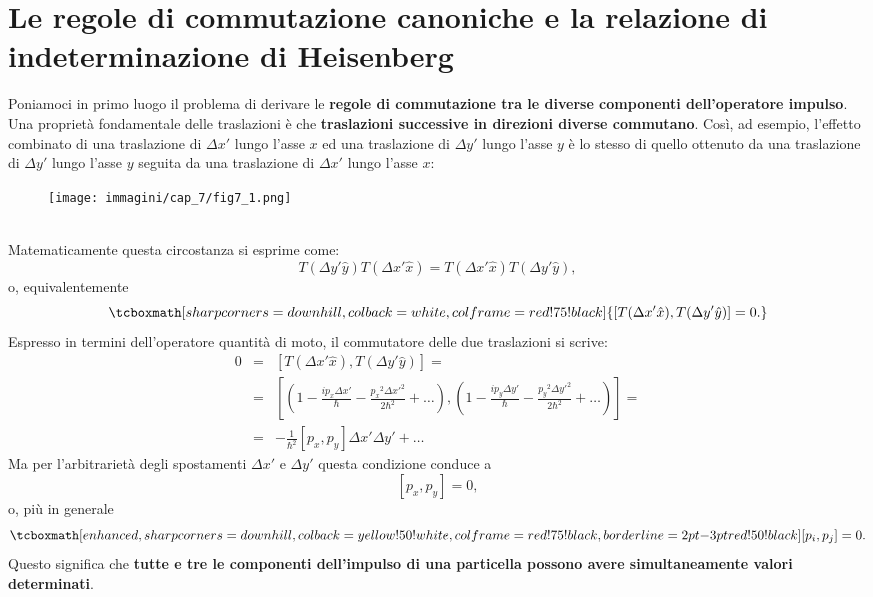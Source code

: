\documentclass[a4paper,12pt,oneside]{book}
\begin{document}
\section[Le regole di commutazione canoniche e la relazione di indeterminazione di Heisenberg]{Le regole di commutazione canoniche e la relazione di indeterminazione di Heisenberg}
Poniamoci in primo luogo il problema di derivare le \textbf{regole di commutazione tra le diverse componenti dell'operatore impulso}.\\
Una proprietà fondamentale delle traslazioni è che \textbf{traslazioni successive in direzioni diverse commutano}. Così, ad esempio, l'effetto combinato di una traslazione di $\Delta x'$ lungo l'asse $x$ ed una traslazione di $\Delta y'$ lungo l'asse $y$ è lo stesso di quello ottenuto da una traslazione di $\Delta y'$ lungo l'asse $y$ seguita da una traslazione di $\Delta x'$ lungo l'asse $x$:\\
\begin{figure}[!htbp]
\begin{center}
\texttt{[image: immagini/cap\_7/fig7\_1.png]}
\end{center}
\end{figure}\\
Matematicamente questa circostanza si esprime come:
	\begin{equation}
		T(\Delta y'\hat{y})T(\Delta x'\hat{x})= T(\Delta x'\hat{x})T(\Delta y'\hat{y}),
	\end{equation}
o, equivalentemente
	\begin{equation}
		\tcboxmath[sharp corners=downhill ,colback=white,colframe=red!75!black]{
			\left[ T(\Delta x'\hat{x}), T(\Delta y'\hat{y})\right] =0.
			}
	\end{equation}
Espresso in termini dell'operatore quantità di moto, il commutatore delle due traslazioni si scrive:
	\begin{eqnarray}
		0 & = & \left[ T(\Delta x'\hat{x}), T(\Delta y'\hat{y})\right] =   \nonumber \\
		 & = & \left[\left( 1-\frac{i p_x \Delta x'}{\hbar}-\frac{ {p_x} ^2 {\Delta x'}^2}{2\hbar ^2}+\dots \right), \left( 1-\frac{i p_y \Delta y'}{\hbar}-\frac{ {p_y} ^2 {\Delta y'}^2}{2\hbar ^2}+\dots\right) \right] = \nonumber  \\
		& = & -\frac{1}{\hbar ^2}\left[p_x, p_y \right]\Delta x' \Delta y' + \dots
	\end{eqnarray}
Ma per l'arbitrarietà degli spostamenti $\Delta x'$ e  $\Delta y'$ questa condizione conduce a
	\begin{equation}
		\left[p_x , p_y\right] =0,
	\end{equation}
o, più in generale
	\begin{equation}
		\tcboxmath[enhanced,sharp corners=downhill ,colback=yellow!50!white,colframe=red!75!black, borderline={2pt}{-3pt}{red!50!black}]{
			\left[p_i , p_j\right] =0.
			}
	\end{equation}
Questo significa che \textbf{tutte e tre le componenti dell'impulso di una particella possono avere simultaneamente valori determinati}.\\
\end{document}

